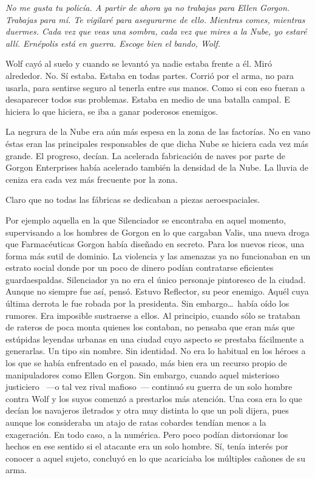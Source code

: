 \emph{No me gusta tu policía. A partir de ahora ya no trabajas para Ellen Gorgon. Trabajas para mí. Te vigilaré para asegurarme de ello. Mientras comes, mientras duermes. Cada vez que veas una sombra, cada vez que mires a la Nube, yo estaré allí. Ernépolis está en guerra. Escoge bien el bando, Wolf.}

Wolf cayó al suelo y cuando se levantó ya nadie estaba frente a él. Miró alrededor. No. Sí estaba. Estaba en todas partes. Corrió por el arma, no para usarla, para sentirse seguro al tenerla entre sus manos. Como si con eso fueran a desaparecer todos sus problemas. Estaba en medio de una batalla campal. E hiciera lo que hiciera, se iba a ganar poderosos enemigos.

\parbreak
La negrura de la Nube era aún más espesa en la zona de las factorías. No en vano éstas eran las principales responsables de que dicha Nube se hiciera cada vez más grande. El progreso, decían. La acelerada fabricación de naves por parte de Gorgon Enterprises había acelerado también la densidad de la Nube. La lluvia de ceniza era cada vez más frecuente por la zona.

Claro que no todas las fábricas se dedicaban a piezas aeroespaciales.

Por ejemplo aquella en la que Silenciador se encontraba en aquel momento, supervisando a los hombres de Gorgon en lo que cargaban Valis, una nueva droga que Farmacéuticas Gorgon había diseñado en secreto. Para los nuevos ricos, una forma más sutil de dominio. La violencia y las amenazas ya no funcionaban en un estrato social donde por un poco de dinero podían contratarse eficientes guardaespaldas. Silenciador ya no era el único personaje pintoresco de la ciudad. Aunque no siempre fue así, pensó. Estuvo Reflector, su peor enemigo. Aquél cuya última derrota le fue robada por la presidenta. Sin embargo\dots\ había oído los rumores. Era imposible sustraerse a ellos. Al principio, cuando sólo se trataban de rateros de poca monta quienes los contaban, no pensaba que eran más que estúpidas leyendas urbanas en una ciudad cuyo aspecto se prestaba fácilmente a generarlas. Un tipo sin nombre. Sin identidad. No era lo habitual en los héroes a los que se había enfrentado en el pasado, más bien era un recurso propio de manipuladores como Ellen Gorgon. Sin embargo, cuando aquel misterioso justiciero ~---o tal vez rival mafioso~--- continuó su guerra de un solo hombre contra Wolf y los suyos comenzó a prestarlos más atención. Una cosa era lo que decían los navajeros iletrados y otra muy distinta lo que un poli dijera, pues aunque los consideraba un atajo de ratas cobardes tendían menos a la exageración. En todo caso, a la numérica. Pero poco podían distorsionar los hechos en ese sentido si el atacante era un solo hombre. Sí, tenía interés por conocer a aquel sujeto, concluyó en lo que acariciaba los múltiples cañones de su arma.

